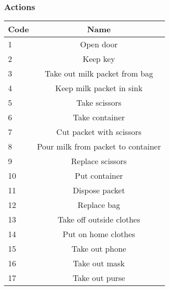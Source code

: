 \documentclass[12pts]{article}
\begin{document}
\subsubsection*{Actions}
\begin{center}
\begin{tabular}{|l|c|}
\hline
Code & Name \\
\hline
\hline
1 & Open door \\
2 & Keep key \\
3 & Take out milk packet from bag \\
4 & Keep milk packet in sink\\
5 & Take scissors \\
6 & Take container \\
7 & Cut packet with scissors \\
8 & Pour milk from packet to container \\
9 & Replace scissors \\
10 & Put container \\
11 & Dispose packet \\
12 & Replace bag \\
13 & Take off outside clothes \\
14 & Put on home clothes \\
15 & Take out phone \\
16 & Take out mask \\
17 & Take out purse \\
\hline
\end{tabular}
\end{center}
\end{document}
